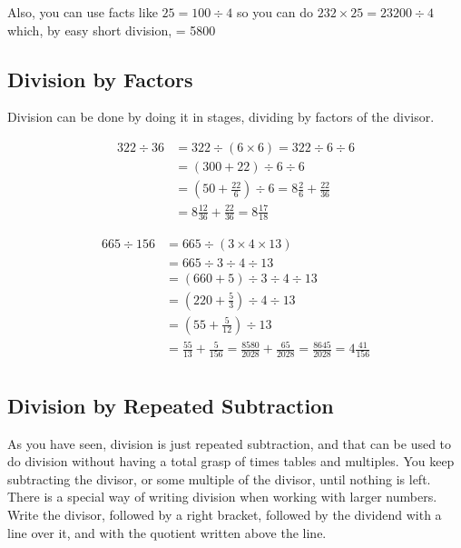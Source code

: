 \documentclass{article}
\begin{document}
Also, you can use facts like $25 = 100 \div 4$ so you can do $232 \times 25 = 23200 \div 4$ which, by easy short division, = 5800\\

\newpage
\subsection{Division by Factors}

Division can be done by doing it in stages, dividing by factors of the divisor.

\begin{align*}
322 \div 36 & = 322 \div (6 \times 6) = 322 \div 6 \div 6\\
            & = (300 + 22) \div 6 \div 6\\
            & = (50 + \frac{22}{6}) \div 6 = 8 \frac{2}{6} + \frac{22}{36}\\
            & = 8 \frac{12}{36} + \frac{22}{36} = 8 \frac{17}{18}
\end{align*}

\begin{align*}
665 \div 156 & = 665 \div (3 \times 4 \times 13)\\
             & = 665 \div 3 \div 4 \div 13\\
             & = (660 + 5) \div 3 \div 4 \div 13\\
             & = (220 + \frac{5}{3}) \div 4 \div 13\\
             & = (55 + \frac{5}{12}) \div 13\\
             & = \frac{55}{13} + \frac{5}{156} = \frac{8580}{2028} + \frac{65}{2028} = \frac{8645}{2028} = 4 \frac{41}{156}\\
\end{align*}

\newpage
\subsection{Division by Repeated Subtraction}
As you have seen, division is just repeated subtraction, and that can be used to do division without having a total grasp of times tables and multiples. You keep subtracting the divisor, or some multiple of the divisor, until nothing is left.\\

There is a special way of writing division when working with larger numbers. Write the divisor, followed by a right bracket, followed by the dividend with a line over it, and with the quotient written above the line.
\end{document}
